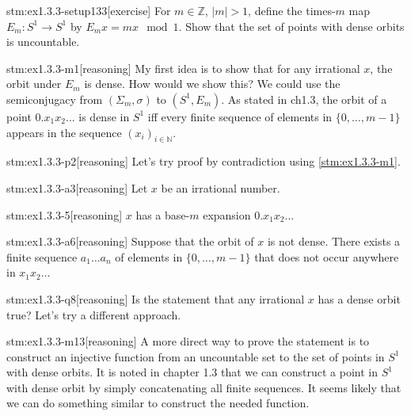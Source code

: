 
\begin{stm}{stm:ex1.3.3-setup133}[exercise]
For $m \in \mathbb{Z}$, $|m| > 1$, define the times-$m$ map $E_m : S^1 \to S^1$ by $E_m x = mx \mod 1$. Show that the set of points with dense orbits is uncountable.
\end{stm}


\begin{stm}{stm:ex1.3.3-m1}[reasoning]
My first idea is to show that for any irrational $x$, the orbit under $E_m$ is dense. How would we show this? We could use the semiconjugacy from $(\Sigma_m, \sigma)$ to $(S^1, E_m)$. As stated in ch1.3, the orbit of a point $0.x_1 x_2 \dots$ is dense in $S^1$ iff every finite sequence of elements in $\{0, \dots, m-1\}$ appears in the sequence $(x_i)_{i \in \mathbb{N}}$.
\end{stm}

\begin{stm}{stm:ex1.3.3-p2}[reasoning]
Let's try proof by contradiction using \ref{stm:ex1.3.3-m1}.
\end{stm}

\begin{stm}{stm:ex1.3.3-a3}[reasoning]
Let $x$ be an irrational number.
\end{stm}

\begin{stm}{stm:ex1.3.3-5}[reasoning]
$x$ has a base-$m$ expansion $0.x_1 x_2 \dots$
\end{stm}

\begin{stm}{stm:ex1.3.3-a6}[reasoning]
Suppose that the orbit of $x$ is not dense. There exists a finite sequence $a_1 \dots a_n$ of elements in $\{0, \dots, m-1\}$ that does not occur anywhere in $x_1 x_2 \dots$
\end{stm}

\begin{stm}{stm:ex1.3.3-q8}[reasoning]
Is the statement that any irrational $x$ has a dense orbit true? Let's try a different approach.
\end{stm}

\begin{stm}{stm:ex1.3.3-m13}[reasoning]
A more direct way to prove the statement is to construct an injective function from an uncountable set to the set of points in $S^1$ with dense orbits. It is noted in chapter 1.3 that we can construct a point in $S^1$ with dense orbit by simply concatenating all finite sequences. It seems likely that we can do something similar to construct the needed function.
\end{stm}

